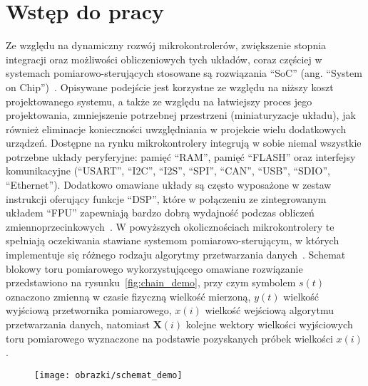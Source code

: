 \chapter{Wstęp do pracy}

Ze względu na dynamiczny rozwój mikrokontrolerów, zwiększenie stopnia integracji oraz możliwości obliczeniowych tych układów, coraz częściej w systemach pomiarowo-sterujących stosowane są rozwiązania \enquote{SoC} (ang. \enquote{System on Chip})~\cite{saleh_systemonchip}. Opisywane podejście jest korzystne ze względu na niższy koszt projektowanego systemu, a także ze względu na łatwiejszy proces jego projektowania, zmniejszenie potrzebnej przestrzeni (miniaturyzacje układu), jak również eliminacje konieczności uwzględniania w projekcie wielu dodatkowych urządzeń. Dostępne na rynku mikrokontrolery integrują w sobie niemal wszystkie potrzebne układy peryferyjne: pamięć \enquote{RAM}, pamięć \enquote{FLASH} oraz interfejsy komunikacyjne (\enquote{USART}, \enquote{I2C}, \enquote{I2S}, \enquote{SPI}, \enquote{CAN}, \enquote{USB}, \enquote{SDIO}, \enquote{Ethernet}). Dodatkowo omawiane układy są często wyposażone w zestaw instrukcji oferujący funkcje \enquote{DSP}, które w połączeniu ze zintegrowanym układem \enquote{FPU} zapewniają bardzo dobrą wydajność podczas obliczeń zmiennoprzecinkowych~\cite{reay_dsp}. W powyższych okolicznościach mikrokontrolery te spełniają oczekiwania stawiane systemom pomiarowo-sterującym, w których implementuje się różnego rodzaju algorytmy przetwarzania danych~\cite{saleh_systemonchip}. Schemat blokowy toru pomiarowego wykorzystującego omawiane rozwiązanie przedstawiono na rysunku~\ref{fig:chain_demo}, przy czym symbolem $s(t)$ oznaczono zmienną w czasie fizyczną wielkość mierzoną, $y(t)$ wielkość wyjściową przetwornika pomiarowego, $x(i)$ wielkość wejściową algorytmu przetwarzania danych, natomiast $\mathbf{X}(i)$ kolejne wektory wielkości wyjściowych toru pomiarowego wyznaczone na podstawie pozyskanych próbek wielkości $x(i)$.

\begin{figure}[htb!]
\begin{center}
\texttt{[image: obrazki/schemat\_demo]}
\end{center}
\end{figure}

